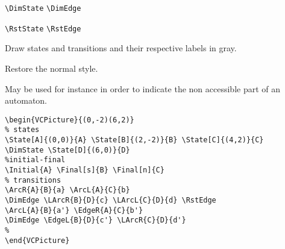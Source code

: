 \documentclass[11pt,twoside]{article}
\newlength{\ColoText}%
\newlength{\ColoFigu}%
\newlength{\parindenttemp} %
\newcommand{\noi}{\noindent}
\newcommand{\ee}{\text{\qquad}}               %
\newlength{\jsIndent}%
\newlength{\ColSource}%
\newlength{\ColFigur}%
\begin{document}
\noi 
\hspace*{-\jsIndent}
\begin{minipage}[t]{\ColoText}
        \par\vspace*{0mm}%
        \footnotesize
\verb+\DimState+ \ee 
\verb+\DimEdge+
   
\medskip 
\verb+\RstState+ \ee 
\verb+\RstEdge+
   
\medskip 
\end{minipage}%
\hspace*{1.2em}%
\begin{minipage}[t]{\ColoFigu}%
\par\vspace*{0mm}%
Draw states and transitions and their 
respective labels in gray.

\smallskip 

Restore the normal style.
\end{minipage}%

\medskip
\noi 
May be used for instance in order to indicate the non accessible part 
of an automaton.

\noi 
\hspace*{-\jsIndent}
\begin{minipage}[c]{\ColFigur}%
\par\vspace*{0mm}%
\begin{center}
%
\end{center}
\end{minipage}%
\hspace*{1.2em}%
\begin{minipage}[c]{\ColSource}
\setlength{\parindent}{\parindenttemp}%
\par\vspace*{0mm}%
\footnotesize
\begin{verbatim}
\begin{VCPicture}{(0,-2)(6,2)}
% states
\State[A]{(0,0)}{A} \State[B]{(2,-2)}{B} \State[C]{(4,2)}{C}
\DimState \State[D]{(6,0)}{D}
%initial-final
\Initial{A} \Final[s]{B} \Final[n]{C}
% transitions 
\ArcR{A}{B}{a} \ArcL{A}{C}{b} 
\DimEdge \LArcR{B}{D}{c} \LArcL{C}{D}{d} \RstEdge
\ArcL{A}{B}{a'} \EdgeR{A}{C}{b'}
\DimEdge \EdgeL{B}{D}{c'} \LArcR{C}{D}{d'}
%
\end{VCPicture}
\end{verbatim}
\normalsize
\end{minipage}%
\end{document}
